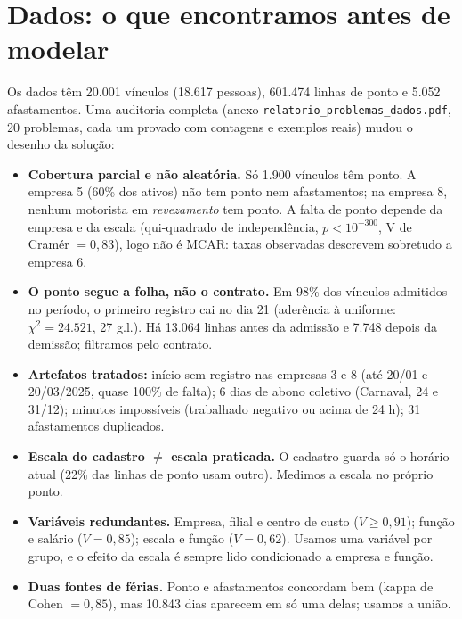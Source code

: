\documentclass[11pt,a4paper]{article}
\begin{document}
\noindent{}

\section{Dados: o que encontramos antes de modelar}
Os dados têm 20.001 vínculos (18.617 pessoas), 601.474 linhas de ponto e 5.052 afastamentos. Uma auditoria completa (anexo \texttt{relatorio\_problemas\_dados.pdf}, 20 problemas, cada um provado com contagens e exemplos reais) mudou o desenho da solução:

\begin{itemize}
\item \textbf{Cobertura parcial e não aleatória.} Só 1.900 vínculos têm ponto. A empresa 5 (60\% dos ativos) não tem ponto nem afastamentos; na empresa 8, nenhum motorista em \emph{revezamento} tem ponto. A falta de ponto depende da empresa e da escala (qui-quadrado de independência, $p<10^{-300}$, V de Cramér $=0{,}83$), logo não é MCAR: taxas observadas descrevem sobretudo a empresa 6.
\item \textbf{O ponto segue a folha, não o contrato.} Em 98\% dos vínculos admitidos no período, o primeiro registro cai no dia 21 (aderência à uniforme: $\chi^2=24.521$, 27 g.l.). Há 13.064 linhas antes da admissão e 7.748 depois da demissão; filtramos pelo contrato.
\item \textbf{Artefatos tratados:} início sem registro nas empresas 3 e 8 (até 20/01 e 20/03/2025, quase 100\% de falta); 6 dias de abono coletivo (Carnaval, 24 e 31/12); minutos impossíveis (trabalhado negativo ou acima de 24 h); 31 afastamentos duplicados.
\item \textbf{Escala do cadastro $\neq$ escala praticada.} O cadastro guarda só o horário atual (22\% das linhas de ponto usam outro). Medimos a escala no próprio ponto.
\item \textbf{Variáveis redundantes.} Empresa, filial e centro de custo ($V\ge0{,}91$); função e salário ($V=0{,}85$); escala e função ($V=0{,}62$). Usamos uma variável por grupo, e o efeito da escala é sempre lido condicionado a empresa e função.
\item \textbf{Duas fontes de férias.} Ponto e afastamentos concordam bem (kappa de Cohen $=0{,}85$), mas 10.843 dias aparecem em só uma delas; usamos a união.
\end{itemize}
\end{document}

